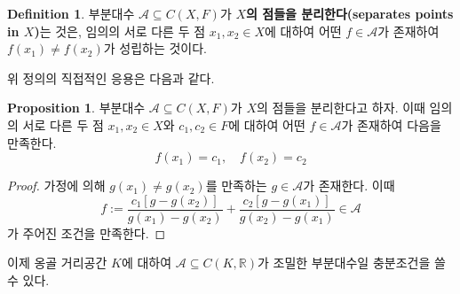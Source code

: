 \documentclass[11pt]{book}
\numberwithin{equation}{chapter}
\def\RR{\mathbb{R}}
\def\calA{\mathcal{A}}
\theoremstyle{definition}
\newtheorem{prop}[thm]{Proposition}
\newtheorem{defn}[thm]{Definition}
\begin{document}
\begin{defn}
    부분대수 \(\calA \subseteq C(X, F)\)가 \textbf{\(X\)의 점들을 분리한다(separates points in \(X\))}는 것은, 임의의 서로 다른 두 점 \(x_1, x_2 \in X\)에 대하여 어떤 \(f \in \calA\)가 존재하여 \(f(x_1) \ne f(x_2)\)가 성립하는 것이다.
\end{defn}

위 정의의 직접적인 응용은 다음과 같다.

\begin{prop} \label{10.3.8}
    부분대수 \(\calA \subseteq C(X, F)\)가 \(X\)의 점들을 분리한다고 하자. 이때 임의의 서로 다른 두 점 \(x_1, x_2 \in X\)와 \(c_1, c_2 \in F\)에 대하여 어떤 \(f \in \calA\)가 존재하여 다음을 만족한다.
    \[
    f(x_1) = c_1, \quad f(x_2) = c_2    
    \]
\end{prop}
\begin{proof}
    가정에 의해 \(g(x_1) \ne g(x_2)\)를 만족하는 \(g \in \calA\)가 존재한다. 이때
    \[
    f := \frac{c_1 [g - g(x_2)]}{g(x_1) - g(x_2)} + \frac{c_2[g - g(x_1)]}{g(x_2) - g(x_1)} \in \calA
    \]
    가 주어진 조건을 만족한다.
\end{proof}

이제 옹골 거리공간 \(K\)에 대하여 \(\calA \subseteq C(K, \RR)\)가 조밀한 부분대수일 충분조건을 쓸 수 있다.
\end{document}
